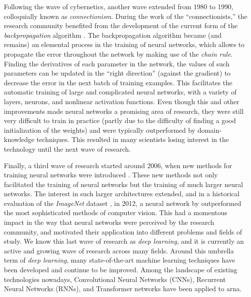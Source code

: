 Following the wave of cybernetics, another wave extended
from 1980 to 1990, colloquially known as
\emph{connectionism}. During the work of the
``connectionists,'' the research community benefited from
the development of the current form of the
\emph{backpropagation} algorithm
\parencite{rumelhart1988learning}. The backpropagation
algorithm became (and remains) an elemental process in the
training of neural networks, which allows to propagate the
error throughout the network by making use of the
\emph{chain rule}. Finding the derivatives of each parameter
in the network, the values of such parameters can be updated
in the ``right direction'' (against the gradient) to
decrease the error in the next batch of training examples.
This facilitates the automatic training of large and
complicated neural networks, with a variety of layers,
neurons, and nonlinear activation functions. Even though
this and other improvements made neural networks a promising
area of research, they were still very difficult to train in
practice (partly due to the difficulty of finding a good
initialization of the weights) and were typically
outperformed by domain-knowledge techniques. This resulted
in many scientists losing interest in the technology until
the next wave of research.

Finally, a third wave of research started around 2006, when
new methods for training neural networks were introduced
\parencite{hinton2006fast}. These new methods not only
facilitated the training of neural networks but the training
of much larger neural networks. The interest in such larger
architectures extended, and in a historical evaluation of
the \emph{ImageNet} dataset \parencite{deng2009imagenet}, in
2012, a neural network by \textcite{krizhevsky2012imagenet}
outperformed the most sophisticated methods of computer
vision. This had a momentous impact in the way that neural
networks were perceived by the research community, and
motivated their application into different problems and
fields of study. We know this last wave of research as
\emph{deep learning}, and it is currently an active and
growing wave of research across many fields. Around this
umbrella term of \emph{deep learning}, many state-of-the-art
machine learning techniques have been developed and continue
to be improved. Among the landscape of existing technologies
nowadays, Convolutional Neural Networks (CNNs), Recurrent
Neural Networks (RNNs), and Transformer networks have been
applied to \gls{arna}.

